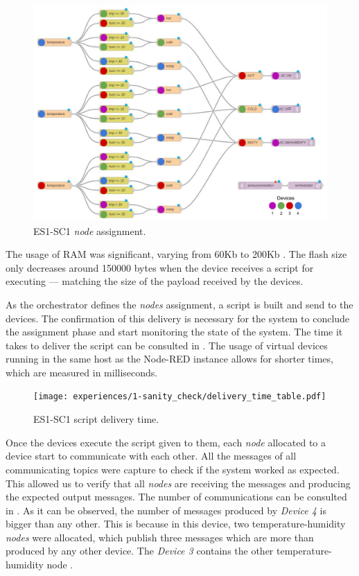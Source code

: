 \begin{figure}[H]
\centering
\includegraphics[width=\linewidth]{thesis/figures/experiences/1-sanity_check/node-assignment-visual.pdf}
\caption[ES1-SC1 \textit{node} assignment.]{ES1-SC1 \textit{node} assignment.}\label{fig:sanity_check_node_assignment_visual}
\end{figure}

The usage of RAM was significant, varying from 60Kb to 200Kb . The flash size only decreases around 150000 bytes when the device receives a script for executing --- matching the size of the payload received by the devices.

As the orchestrator defines the \textit{nodes} assignment, a script is built and send to the devices. The confirmation of this delivery is necessary for the system to conclude the assignment phase and start monitoring the state of the system. The time it takes to deliver the script can be consulted in . The usage of virtual devices running in the same host as the Node-RED instance allows for shorter times, which are measured in milliseconds.

\begin{figure}[H]
\centering
\texttt{[image: experiences/1-sanity\_check/delivery\_time\_table.pdf]}
\caption[ES1-SC1 script delivery time.]{ES1-SC1 script delivery time.}\label{fig:sanity_check_delivery_time}
\end{figure}

Once the devices execute the script given to them, each \textit{node} allocated to a device start to communicate with each other. All the messages of all communicating topics were capture to check if the system worked as expected. This allowed us to verify that all \textit{nodes} are receiving the messages and producing the expected output messages. The number of communications can be consulted in . As it can be observed, the number of messages produced by \textit{Device 4} is bigger than any other. This is because in this device, two temperature-humidity \textit{nodes} were allocated, which publish three messages which are more than produced by any other device. The \textit{Device 3} contains the other temperature-humidity node .

